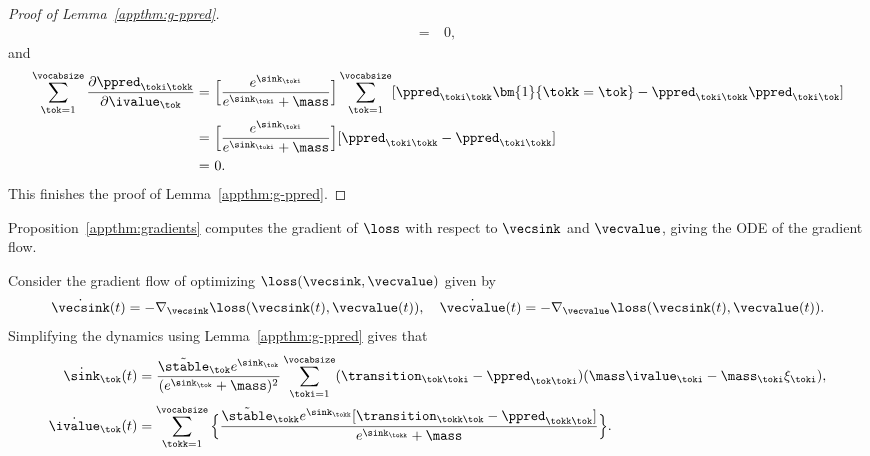 \begin{proof}[Proof of Lemma~\ref{appthm:g-ppred}]
\begin{align*}
= &~ 0,
\end{align*}
and
\begin{align*}
\sum_{\tok=1}^\vocabsize \frac{\partial \ppred_{\toki\tokk}}{\partial \ivalue_\tok} = &~   \Big[\frac{e^{\sink_\toki}}{e^{\sink_\toki}+\mass}\Big] \sum_{\tok=1}^\vocabsize [\ppred_{\toki\tokk} \bm{1}\{\tokk=\tok\} - \ppred_{\toki\tokk} \ppred_{\toki\tok} ]\\
= &~ \Big[\frac{e^{\sink_\toki}}{e^{\sink_\toki}+\mass}\Big] [\ppred_{\toki\tokk} - \ppred_{\toki\tokk} ]\\
= &~ 0.
\end{align*}
This finishes the proof of Lemma~\ref{appthm:g-ppred}.
\end{proof}

Proposition~\ref{appthm:gradients} computes the gradient of $\loss$ with respect to $\vecsink$ and $\vecvalue$, giving the ODE of the gradient flow.
\begin{proposition}\label{appthm:gradients}
Consider the gradient flow of optimizing $\loss(\vecsink, \vecvalue)$ given by 
\begin{equation}\label{appeqn:def-gradient-flow}
\dot{\vecsink}(t) = -\nabla_{\vecsink} \loss(\vecsink(t),\vecvalue(t)), ~~~ \dot{\vecvalue}(t) = -\nabla_{\vecvalue} \loss(\vecsink(t),\vecvalue(t)).
\end{equation}
Simplifying the dynamics using Lemma~\ref{appthm:g-ppred} gives that
\begin{align*}
\dot{\sink}_\tok(t) & = \frac{\Tilde{\stable}_\tok e^{\sink_\tok}}{(e^{\sink_\tok}+\mass)^2} 
\sum_{\toki=1}^\vocabsize({\transition}_{\tok\toki}-{\ppred}_{\tok\toki})(\mass\ivalue_\toki-\mass_\toki\xi_\toki),\\
\dot{\ivalue}_\tok(t) & = \sum_{\tokk=1}^\vocabsize \Big\{\frac{\Tilde{\stable}_\tokk e^{\sink_\tokk} [\transition_{\tokk\tok} - \ppred_{\tokk\tok}]}{e^{\sink_\tokk}+\mass}\Big\}.
\end{align*}
\end{proposition}
